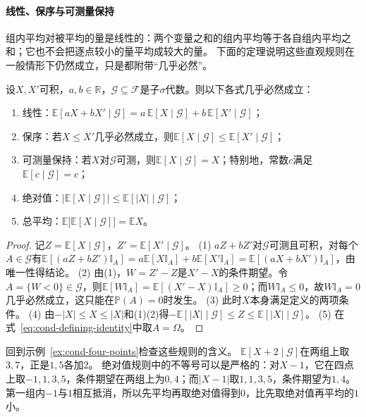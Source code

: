 \paragraph{线性、保序与可测量保持}
组内平均对被平均的量是线性的：两个变量之和的组内平均等于各自组内平均之和；它也不会把逐点较小的量平均成较大的量。
下面的定理说明这些直观规则在一般情形下仍然成立，只是都附带“几乎必然”。

\begin{theorem}[条件期望的基本运算规则]
\label{thm:cond-rules}
设$X,X'$可积，$a,b\in\mathbb R$，$\mathcal G\subseteq\mathcal F$是子$\sigma$代数。则以下各式几乎必然成立：
\begin{enumerate}
  \item 线性：$\mathbb E[aX+bX'\mid\mathcal G]=a\,\mathbb E[X\mid\mathcal G]+b\,\mathbb E[X'\mid\mathcal G]$；
  \item 保序：若$X\leq X'$几乎必然成立，则$\mathbb E[X\mid\mathcal G]\leq\mathbb E[X'\mid\mathcal G]$；
  \item 可测量保持：若$X$对$\mathcal G$可测，则$\mathbb E[X\mid\mathcal G]=X$；特别地，常数$c$满足$\mathbb E[c\mid\mathcal G]=c$；
  \item 绝对值：$\bigl|\mathbb E[X\mid\mathcal G]\bigr|\leq\mathbb E[|X|\mid\mathcal G]$；
  \item 总平均：$\mathbb E\bigl[\mathbb E[X\mid\mathcal G]\bigr]=\mathbb EX$。
\end{enumerate}
\end{theorem}

\begin{proof}
记$Z=\mathbb E[X\mid\mathcal G]$，$Z'=\mathbb E[X'\mid\mathcal G]$。
(1) $aZ+bZ'$对$\mathcal G$可测且可积，对每个$A\in\mathcal G$有$\mathbb E[(aZ+bZ')\mathbb I_A]=a\mathbb E[X\mathbb I_A]+b\mathbb E[X'\mathbb I_A]=\mathbb E[(aX+bX')\mathbb I_A]$，由唯一性得结论。
(2) 由(1)，$W=Z'-Z$是$X'-X$的条件期望。令$A=\{W<0\}\in\mathcal G$，则$\mathbb E[W\mathbb I_A]=\mathbb E[(X'-X)\mathbb I_A]\geq0$；而$W\mathbb I_A\leq0$，故$W\mathbb I_A=0$几乎必然成立，这只能在$\mathbb P(A)=0$时发生。
(3) 此时$X$本身满足定义的两项条件。
(4) 由$-|X|\leq X\leq|X|$和(1)(2)得$-\mathbb E[|X|\mid\mathcal G]\leq Z\leq\mathbb E[|X|\mid\mathcal G]$。
(5) 在式~\eqref{eq:cond-defining-identity}中取$A=\Omega$。
\end{proof}

回到示例~\ref{ex:cond-four-points}检查这些规则的含义。
$\mathbb E[X+2\mid\mathcal G]$在两组上取$3,7$，正是$1,5$各加$2$。
绝对值规则中的不等号可以是严格的：对$X-1$，它在四点上取$-1,1,3,5$，条件期望在两组上为$0,4$；而$|X-1|$取$1,1,3,5$，条件期望为$1,4$。
第一组内$-1$与$1$相互抵消，所以先平均再取绝对值得到$0$，比先取绝对值再平均的$1$小。

